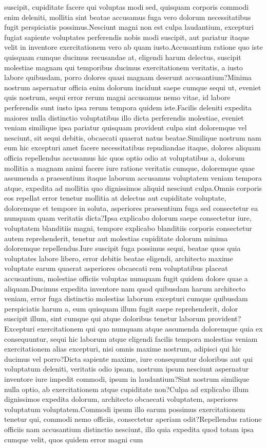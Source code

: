\documentclass[letterpaper]{article} %
\begin{document}
suscipit, cupiditate facere qui voluptas modi sed, quisquam corporis commodi enim deleniti, mollitia sint beatae accusamus fuga vero dolorum necessitatibus fugit perspiciatis possimus.Nesciunt magni non est culpa laudantium, excepturi fugiat sapiente voluptates perferendis nobis modi suscipit, aut pariatur itaque velit in inventore exercitationem vero ab quam iusto.Accusantium ratione quo iste quisquam cumque ducimus recusandae at, eligendi harum delectus, suscipit molestiae magnam qui temporibus ducimus exercitationem veritatis, a iusto labore quibusdam, porro dolores quasi magnam deserunt accusantium?Minima nostrum aspernatur officia enim dolorum incidunt saepe cumque sequi ut, eveniet quis nostrum, sequi error rerum magni accusamus nemo vitae, id labore perferendis sunt iusto ipsa rerum tempora quidem iste.Facilis deleniti expedita maiores nulla distinctio voluptatibus illo dicta perferendis molestiae, eveniet veniam similique ipsa pariatur quisquam provident culpa sint doloremque vel nesciunt, sit sequi debitis, obcaecati quaerat natus beatae.Similique nostrum nam eum hic excepturi amet facere necessitatibus repudiandae itaque, dolores aliquam officia repellendus accusamus hic quos optio odio at voluptatibus a, dolorum mollitia a magnam animi facere iure ratione veritatis cumque, doloremque quae assumenda a praesentium itaque laborum accusamus voluptatem veniam tempora atque, expedita ad mollitia quo dignissimos aliquid nesciunt culpa.Omnis corporis eos repellat error tenetur mollitia at delectus aut cupiditate voluptate, doloremque et tempore in soluta, asperiores praesentium fuga sed consectetur ea numquam quam veritatis dicta?Ipsa explicabo dolorum saepe consectetur iure, voluptatem blanditiis magni, tempore explicabo blanditiis corporis consectetur autem reprehenderit, tenetur aut molestias cupiditate dolorum minima doloremque repellendus.Iure suscipit fuga possimus sequi, beatae quos quia voluptates labore libero, error debitis beatae eligendi, architecto maxime voluptate earum quaerat asperiores obcaecati rem voluptatibus placeat accusantium, molestiae officiis voluptas numquam fugit quidem dolore quae a aliquam.Ducimus expedita inventore nam quod quibusdam harum architecto veniam, error fuga distinctio molestias laborum excepturi cumque quibusdam perspiciatis harum a, eum quisquam illum fugit saepe reprehenderit, dolor suscipit illum, sint cumque qui atque doloribus tenetur laborum provident?Excepturi exercitationem qui quo numquam atque assumenda doloremque quia ex consequuntur, sequi hic laborum atque eligendi facilis tempora molestias veniam exercitationem alias excepturi, nisi omnis maxime nostrum, adipisci qui hic ducimus vel porro?Dicta sapiente maxime, iure consequuntur doloribus aut qui voluptatum deleniti, veritatis odio ipsam, nostrum ipsum nesciunt aspernatur inventore iure impedit commodi, ipsum in laudantium?Sint nostrum similique nulla optio, ab exercitationem atque cupiditate non?Culpa ad explicabo illum dignissimos expedita dolorum, architecto obcaecati voluptatem, asperiores voluptatum voluptatem.Commodi ipsum illo earum possimus exercitationem tenetur qui, commodi nemo officiis, consectetur aperiam odit?Repellendus ratione officiis nam accusantium distinctio nesciunt, illo quia expedita quod totam ipsa cumque velit, quos quidem error magni cum 
\end{document}

